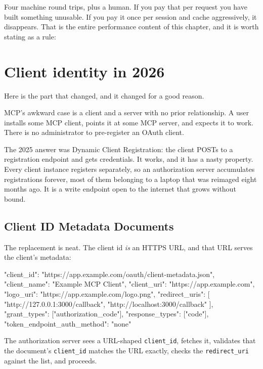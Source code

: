 Four machine round trips, plus a human. If you pay that per request you have
built something unusable. If you pay it once per session and cache aggressively,
it disappears. That is the entire performance content of this chapter, and it is
worth stating as a rule:


\section{Client identity in 2026}

Here is the part that changed, and it changed for a good reason.

MCP's awkward case is a client and a server with no prior relationship. A user
installs some MCP client, points it at some MCP server, and expects it to work.
There is no administrator to pre-register an OAuth client.

The 2025 answer was Dynamic Client Registration: the client POSTs to a
registration endpoint and gets credentials. It works, and it has a nasty
property. Every client instance registers separately, so an authorization server
accumulates registrations forever, most of them belonging to a laptop that was
reimaged eight months ago. It is a write endpoint open to the internet that
grows without bound.

\subsection{Client ID Metadata Documents}
\label{sec:client-identity}

The replacement is neat. The client id \emph{is} an HTTPS URL, and that URL
serves the client's metadata:

\begin{wire}
{
  "client_id": "https://app.example.com/oauth/client-metadata.json",
  "client_name": "Example MCP Client",
  "client_uri": "https://app.example.com",
  "logo_uri": "https://app.example.com/logo.png",
  "redirect_uris": [
    "http://127.0.0.1:3000/callback",
    "http://localhost:3000/callback"
  ],
  "grant_types": ["authorization_code"],
  "response_types": ["code"],
  "token_endpoint_auth_method": "none"
}
\end{wire}

The authorization server sees a URL-shaped \texttt{client\_id}, fetches it,
validates that the document's \texttt{client\_id} matches the URL exactly,
checks the \texttt{redirect\_uri} against the list, and proceeds.

